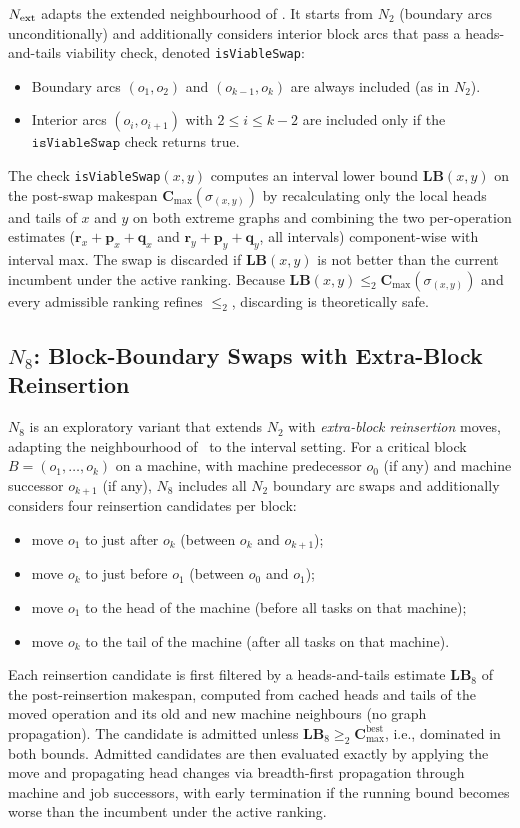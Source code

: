 \documentclass[preprint,12pt]{elsarticle}
\begin{document}
$N_{\rm ext}$ adapts the extended neighbourhood of \cite{Nowicki2005}. It starts from $N_2$ (boundary arcs unconditionally) and additionally considers interior block arcs that pass a heads-and-tails viability check, denoted \texttt{isViableSwap}:
\begin{itemize}
\item Boundary arcs $(o_1,o_2)$ and $(o_{k-1},o_k)$ are always included (as in $N_2$).
\item Interior arcs $(o_i, o_{i+1})$ with $2 \leq i \leq k-2$ are included only if the $\texttt{isViableSwap}$ check returns true.
\end{itemize}
The check \texttt{isViableSwap}$(x,y)$ computes an interval lower bound $\mathbf{LB}(x,y)$ on the post-swap makespan $\mathbf{C}_{\max}(\sigma_{(x,y)})$ by recalculating only the local heads and tails of $x$ and $y$ on both extreme graphs and combining the two per-operation estimates ($\mathbf{r}_x + \mathbf{p}_x + \mathbf{q}_x$ and $\mathbf{r}_y + \mathbf{p}_y + \mathbf{q}_y$, all intervals) component-wise with interval max. The swap is discarded if $\mathbf{LB}(x,y)$ is not better than the current incumbent under the active ranking. Because $\mathbf{LB}(x,y) \le_2 \mathbf{C}_{\max}(\sigma_{(x,y)})$ and every admissible ranking refines $\le_2$, discarding is theoretically safe.

\subsection{$N_8$: Block-Boundary Swaps with Extra-Block Reinsertion}
\label{sec:N8}

$N_8$ is an exploratory variant that extends $N_2$ with \emph{extra-block reinsertion} moves, adapting the neighbourhood of~\cite{Xie2022} to the interval setting. For a critical block $B = (o_1,\ldots,o_k)$ on a machine, with machine predecessor $o_0$ (if any) and machine successor $o_{k+1}$ (if any), $N_8$ includes all $N_2$ boundary arc swaps and additionally considers four reinsertion candidates per block:
\begin{itemize}
\item move $o_1$ to just after $o_k$ (between $o_k$ and $o_{k+1}$);
\item move $o_k$ to just before $o_1$ (between $o_0$ and $o_1$);
\item move $o_1$ to the head of the machine (before all tasks on that machine);
\item move $o_k$ to the tail of the machine (after all tasks on that machine).
\end{itemize}
Each reinsertion candidate is first filtered by a heads-and-tails estimate $\mathbf{LB}_8$ of the post-reinsertion makespan, computed from cached heads and tails of the moved operation and its old and new machine neighbours (no graph propagation). The candidate is admitted unless $\mathbf{LB}_8 \ge_2 \mathbf{C}_{\max}^{\text{best}}$, i.e., dominated in both bounds. Admitted candidates are then evaluated exactly by applying the move and propagating head changes via breadth-first propagation through machine and job successors, with early termination if the running bound becomes worse than the incumbent under the active ranking.
\end{document}

